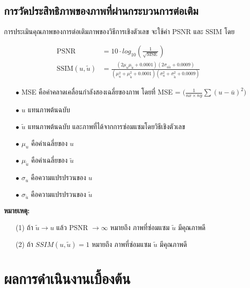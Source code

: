 \documentclass[hidelinks, a4paper,12pt]{article}
\numberwithin{equation}{section}							%
\numberwithin{equation}{section}
\begin{document}
{\subsection{การวัดประสิทธิภาพของภาพที่ผ่านกระบวนการต่อเติม}

\hspace{1cm} การประเมินคุณภาพของการต่อเติมภาพของวิธีการเชิงตัวเลข จะใช้ค่า PSNR \cite{ref:PSNR} และ SSIM \cite{ref:SSIM} โดย

\begin{align*}
	 \text{PSNR}  &= 10 \cdot log_{10} ( \frac{1}{\sqrt{\text{MSE}}} ) \\
	\text{SSIM}(u,\tilde{u}) &= \frac{(2\mu_u\mu_{\tilde{u}} + 0.0001)(2\sigma_{u\tilde{u}} + 0.0009)}{(\mu_u^2+\mu_{\tilde{u}}^2+0.0001)(\sigma_u^2+\sigma_{\tilde{u}}^2+0.0009)}
\end{align*}

\begin{itemize}
	\item[$\bullet$] MSE คือค่าคลาดเคลื่อนกำลังสองเฉลี่ยของภาพ โดยที่ MSE = $\bigg( \frac{1}{nx \times ny} \sum (u - \bar{u})^2  \bigg)$
	\item[$\bullet$] $u$ แทนภาพต้นฉบับ
	\item[$\bullet$] $\tilde{u}$  แทนภาพต้นฉบับ และภาพที่ได้จากการซ่อมแซมโดยวิธีเชิงตัวเลข
	\item[$\bullet$] $\mu_u$ คือค่าเฉลี่ยของ $u$
	\item[$\bullet$] $\mu_{\tilde{u}}$ คือค่าเฉลี่ยของ $\tilde{u}$
	\item[$\bullet$]  $\sigma_u$ คือความแปรปรวนของ $u$ 
	\item[$\bullet$] $\sigma_{\tilde{u}}$ คือความแปรปรวนของ $\tilde{u}$
\end{itemize}

\textbf{หมายเหตุ:}
\begin{itemize}
	\item [(1)] ถ้า $\tilde{u} \longrightarrow u $ แล้ว PSNR $\longrightarrow \infty$ หมายถึง ภาพที่ซ่อมแซม $\tilde{u}$ มีคุณภาพดี
	\item [(2)] ถ้า $SSIM(u,\tilde{u}) = 1 $
	หมายถึง ภาพที่ซ่อมแซม $\tilde{u}$ มีคุณภาพดี
\end{itemize}


\vspace{1cm}

\section{ผลการดำเนินงานเบื้องต้น}
}
\end{document}
